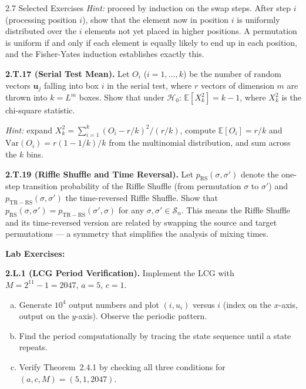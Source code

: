 \documentclass[aspectratio=169,10pt]{beamer}
\begin{document}
\begin{frame}[allowframebreaks]{2.7 Selected Exercises}
\emph{Hint:} proceed by induction on the swap steps.  After step $i$
(processing position $i$), show that the element now in position $i$ is
uniformly distributed over the $i$ elements not yet placed in higher
positions.  A permutation is uniform if and only if each element is equally
likely to end up in each position, and the Fisher-Yates induction establishes
exactly this.

\medskip
\textbf{2.T.17 (Serial Test Mean).}
Let $O_i$ ($i = 1, \ldots, k$) be the number of random vectors
$\mathbf{u}_j$ falling into box $i$ in the serial test, where $r$ vectors
of dimension $m$ are thrown into $k = L^m$ boxes.  Show that under
$\mathcal{H}_0$: $\mathbb{E}[X_k^2] = k - 1$, where $X_k^2$ is the
chi-square statistic.

\emph{Hint:} expand $X_k^2 = \sum_{i=1}^k (O_i - r/k)^2 / (r/k)$,
compute $\mathbb{E}[O_i] = r/k$ and $\mathrm{Var}(O_i) = r(1-1/k)/k$
from the multinomial distribution, and sum across the $k$ bins.

\medskip
\textbf{2.T.19 (Riffle Shuffle and Time Reversal).}
Let $p_{\mathrm{RS}}(\sigma, \sigma')$ denote the one-step transition
probability of the Riffle Shuffle (from permutation $\sigma$ to $\sigma'$)
and $p_{\mathrm{TR-RS}}(\sigma, \sigma')$ the time-reversed Riffle Shuffle.
Show that $p_{\mathrm{RS}}(\sigma, \sigma') = p_{\mathrm{TR-RS}}(\sigma', \sigma)$
for any $\sigma, \sigma' \in \mathcal{S}_n$.  This means the Riffle Shuffle
and its time-reversed version are related by swapping the source and target
permutations --- a symmetry that simplifies the analysis of mixing times.

\framebreak

\textbf{Lab Exercises:}

\textbf{2.L.1 (LCG Period Verification).}
Implement the LCG with $M = 2^{11} - 1 = 2047$, $a = 5$, $c = 1$.
\begin{enumerate}[(a)]
  \item Generate $10^4$ output numbers and plot $(i, u_i)$ versus $i$
    (index on the $x$-axis, output on the $y$-axis).  Observe the
    periodic pattern.
  \item Find the period computationally by tracing the state sequence
    until a state repeats.
  \item Verify Theorem~2.4.1 by checking all three conditions for
    $(a, c, M) = (5, 1, 2047)$.
\end{enumerate}


\end{frame}
\end{document}
